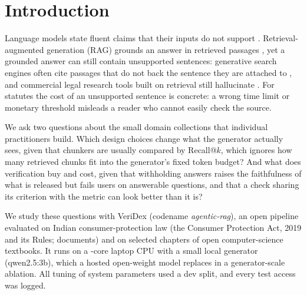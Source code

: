\section{Introduction}
\label{sec:intro}

Language models state fluent claims that their inputs do not support \citep{ji2023survey}.
Retrieval-augmented generation (RAG) grounds an answer in retrieved passages \citep{lewis2020rag,karpukhin2020dpr}, yet a grounded answer can still contain unsupported sentences: generative search engines often cite passages that do not back the sentence they are attached to \citep{liu2023verifiability}, and commercial legal research tools built on retrieval still hallucinate \citep{magesh2024hallucination,dahl2024fictions}.
For statutes the cost of an unsupported sentence is concrete: a wrong time limit or monetary threshold misleads a reader who cannot easily check the source.

We ask two questions about the small domain collections that individual practitioners build.
Which design choices change what the generator actually sees, given that chunkers are usually compared by Recall@$k$, which ignores how many retrieved chunks fit into the generator's fixed token budget?
And what does verification buy and cost, given that withholding answers raises the faithfulness of what is released but fails users on answerable questions, and that a check sharing its criterion with the metric can look better than it is?

We study these questions with VeriDex (codename \emph{agentic-rag}), an open pipeline evaluated on Indian consumer-protection law (the Consumer Protection Act, 2019 and its Rules;  documents) and on selected chapters of  open computer-science textbooks.
It runs on a -core laptop CPU with a small local generator (qwen2.5:3b), which a hosted open-weight model replaces in a generator-scale ablation. All tuning of system parameters used a dev split, and every test access was logged.

